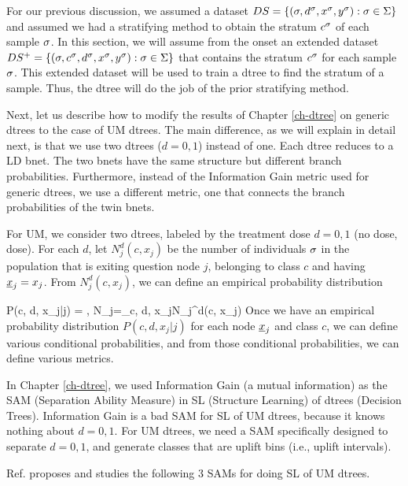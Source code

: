 \documentclass[12pt]{report}
\begin{document}
For our previous discussion,
we assumed a dataset
$DS= \{ (\sigma, d^\sigma, x^\sigma, y^\sigma):
 \sigma\in\Sigma\}$ and
 assumed we had a stratifying
 method to obtain the stratum
 $c^\sigma$ of each sample $\sigma$.
In this section, we will assume
from the onset an
extended dataset
$DS^+= \{ (\sigma, c^\sigma, d^\sigma, x^\sigma, y^\sigma):
 \sigma\in\Sigma\}$
that contains the stratum $c^\sigma$ for each sample $\sigma$.
This extended dataset will be used
to train a dtree to find the stratum of
a sample. Thus, the dtree will
do the job of the prior stratifying method.

Next,
let us describe how to
modify the results
of Chapter \ref{ch-dtree}
on generic dtrees
to the case of UM dtrees.
The main difference,
as we will
explain in detail
next,
is that we use two dtrees ($d=0,1$) instead
of one. Each dtree reduces to a LD bnet. The two
bnets have the same structure but
different branch probabilities.
Furthermore, instead of the Information
Gain metric
used for generic dtrees,
we use a different
metric, one
that connects the branch probabilities
of the twin bnets.

For UM, we consider two dtrees,
labeled by the treatment dose $d=0,1$ (no dose, dose).
For each $d$, let $N_j^d(c, x_j)$ be the number
of individuals $\sigma$
in the population that is exiting question node $j$,
belonging to class $c$ and having $\rvx_j=x_j$.
From $N_j^d(c, x_j)$, we can define
an empirical
probability distribution

\beq
P(c, d, x_j|j)
=
\;,\;\; 
N_j=\sum_{c, d, x_j}N_j^d(c, x_j)
\eeq
Once
we have an empirical probability distribution
$P(c, d, x_j| j)$ for each node $\rvx_j$ and
class $c$,
we can define various conditional
probabilities, and from those
conditional probabilities,
we can define various metrics.



In Chapter
\ref{ch-dtree},
we used Information
Gain
(a mutual information)
as the SAM (Separation Ability Measure)
in
SL (Structure Learning)
of dtrees (Decision Trees).
Information Gain
is a bad
SAM for SL of UM dtrees,
because it knows nothing about
 $d=0,1$.
For
UM dtrees,
we need a SAM specifically
designed to separate $d=0,1$, and generate
classes that are
 uplift bins (i.e., uplift intervals).


Ref.\cite{jaros}
proposes and studies
the following
3 SAMs
for doing SL of UM dtrees.
\end{document}
